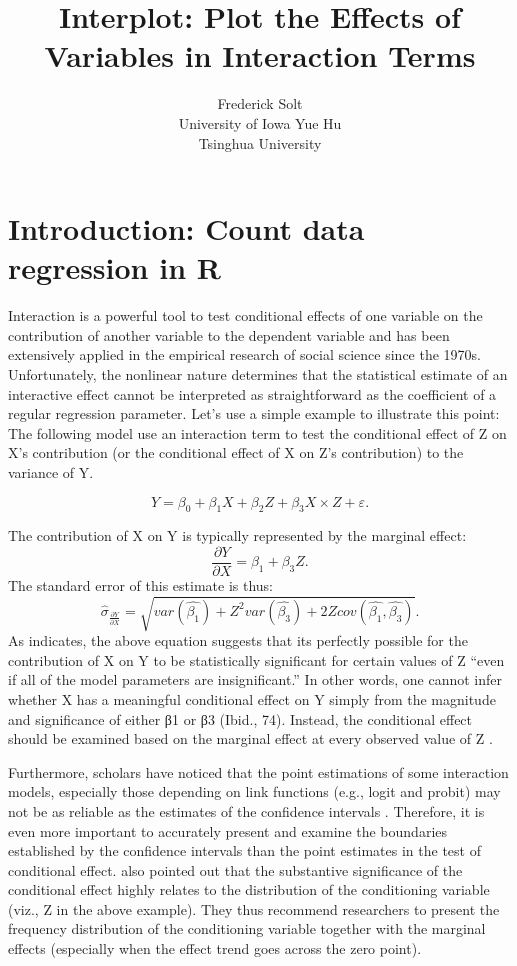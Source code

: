 \documentclass[
  article]{jss}
\author{Frederick Solt\\University of Iowa \And Yue Hu\\Tsinghua
University}
\title{Interplot: Plot the Effects of Variables in Interaction Terms}
\begin{document}
\maketitle
\hypertarget{sec-intro}{%
\section{Introduction: Count data regression in R}\label{sec-intro}}

Interaction is a powerful tool to test conditional effects of one
variable on the contribution of another variable to the dependent
variable and has been extensively applied in the empirical research of
social science since the 1970s. Unfortunately, the nonlinear nature
determines that the statistical estimate of an interactive effect cannot
be interpreted as straightforward as the coefficient of a regular
regression parameter. Let's use a simple example to illustrate this
point: The following model use an interaction term to test the
conditional effect of Z on X's contribution (or the conditional effect
of X on Z's contribution) to the variance of Y.

\[
Y = \beta_0 + \beta_1X + \beta_2Z + \beta_3X\times Z + \varepsilon.
\]

The contribution of X on Y is typically represented by the marginal
effect: \[
\frac{\partial Y}{\partial X} = \beta_1 + \beta_3Z.
\] The standard error of this estimate is thus: \[
\hat{\sigma}_{\frac{\partial Y}{\partial X}} = \sqrt{var(\hat{\beta_1}) + Z^2var(\hat{\beta_3}) + 2Zcov(\hat{\beta_1}, \hat{\beta_3})}.
\] As \citep{BramborClarkGolder2006} indicates, the above equation
suggests that its perfectly possible for the contribution of X on Y to
be statistically significant for certain values of Z ``even if all of
the model parameters are insignificant.'' In other words, one cannot
infer whether X has a meaningful conditional effect on Y simply from the
magnitude and significance of either β1 or β3 (Ibid., 74). Instead, the
conditional effect should be examined based on the marginal effect at
every observed value of Z
\citep{BerryGolderMilton2012, BramborClarkGolder2006, Braumoeller2004}.

Furthermore, scholars have noticed that the point estimations of some
interaction models, especially those depending on link functions (e.g.,
logit and probit) may not be as reliable as the estimates of the
confidence intervals \citep{BerryDeMerittEsarey2016}. Therefore, it is
even more important to accurately present and examine the boundaries
established by the confidence intervals than the point estimates in the
test of conditional effect. \citep{BerryGolderMilton2012} also pointed
out that the substantive significance of the conditional effect highly
relates to the distribution of the conditioning variable (viz., Z in the
above example). They thus recommend researchers to present the frequency
distribution of the conditioning variable together with the marginal
effects (especially when the effect trend goes across the zero point).
\end{document}
